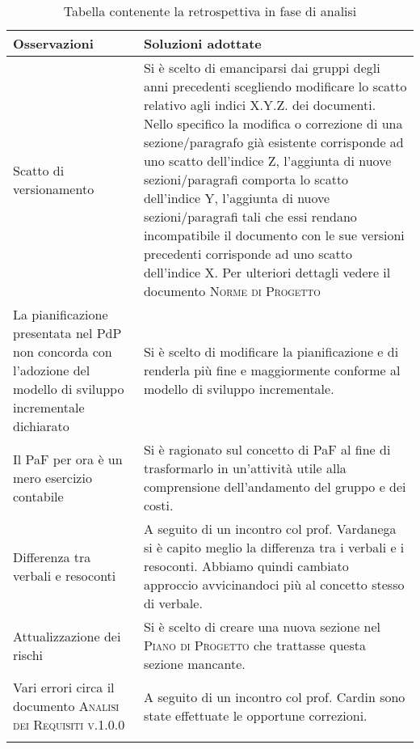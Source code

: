 \documentclass[../piano_di_qualifica.tex]{subfiles}
\begin{document}
\begin{center}
	\begin{longtable}{|p{5cm}|p{10cm}|}
		\hline
		\rowcolor{lightgray}
		\textbf{Osservazioni}                                                 & \textbf{Soluzioni adottate}                                      \\
		\hline
		Scatto di versionamento                                               &
		Si è scelto di emanciparsi dai gruppi degli anni precedenti scegliendo modificare
		lo scatto relativo agli indici X.Y.Z. dei documenti. Nello specifico la modifica o correzione di una sezione/paragrafo già esistente
		corrisponde ad uno scatto dell'indice Z, l'aggiunta di nuove sezioni/paragrafi comporta lo scatto dell'indice Y, l'aggiunta di nuove sezioni/paragrafi tali che essi rendano incompatibile il documento con le sue versioni precedenti corrisponde ad uno scatto dell'indice X.
		Per ulteriori dettagli vedere il documento \textsc{Norme di Progetto}                                                                    \\

		La pianificazione presentata nel PdP non concorda con l’adozione del modello
		di sviluppo incrementale dichiarato                                   &
		Si è scelto di modificare la pianificazione e di renderla più fine e maggiormente conforme al modello di
		sviluppo incrementale.                                                                                                                   \\

		Il PaF per ora è un mero esercizio contabile                          &
		Si è ragionato sul concetto di PaF al fine di trasformarlo in un'attività utile alla comprensione dell'andamento del gruppo e dei costi. \\

		Differenza tra verbali e resoconti                                    &
		A seguito di un incontro col prof. Vardanega si è capito meglio la differenza tra i verbali e i resoconti. Abbiamo quindi cambiato approccio
		avvicinandoci più al concetto stesso di verbale.                                                                                         \\

		Attualizzazione dei rischi                                            &
		Si è scelto di creare una nuova sezione nel \textsc{Piano di Progetto} che trattasse questa sezione mancante.                            \\

		Vari errori circa il documento \textsc{Analisi dei Requisiti v.1.0.0} &
		A seguito di un incontro col prof. Cardin sono state effettuate le opportune correzioni.                                                 \\

		\hline
		\rowcolor{white}
		\caption{Tabella contenente la retrospettiva in fase di analisi}
	\end{longtable}
\end{center}
\end{document}
